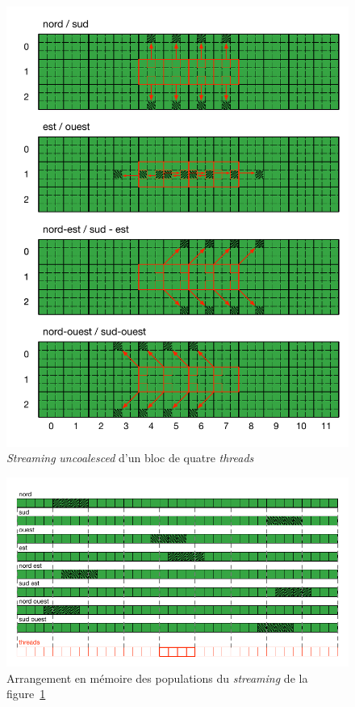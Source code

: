 \begin{figure}[H]
	\centering
	\includegraphics[fbox,scale=.7]{images/streaming/sailfish_hist_misaligned.pdf}
	\caption{\textit{Streaming} \textit{uncoalesced} d'un bloc de quatre \textit{threads}}
	\label{fig:sailfish_hist_misaligned}
\end{figure}

\begin{figure}[H]
	\centering
	\includegraphics[fbox,scale=1]{images/streaming/sailfish_hist_alignment.pdf}
	\caption{Arrangement en mémoire des populations du \textit{streaming} de la figure~\ref{fig:sailfish_hist_misaligned}}
	\label{fig:sailfish_hist_alignment}
\end{figure}


